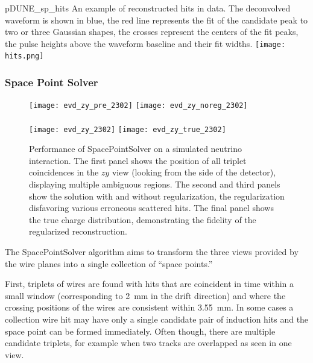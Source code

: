 \begin{dunefigure}
{pDUNE_sp_hits}
{An example of reconstructed hits in  data. The deconvolved waveform is shown in blue, the red line represents the fit of the candidate peak to two or three Gaussian shapes, the crosses represent the centers of the fit peaks, the pulse heights above the waveform baseline and their fit widths.}
\texttt{[image: hits.png]}
\end{dunefigure}


\subsubsection{Space Point Solver}

\begin{figure}
\texttt{[image: evd\_zy\_pre\_2302]}
\texttt{[image: evd\_zy\_noreg\_2302]}\\
\\
\texttt{[image: evd\_zy\_2302]}
\texttt{[image: evd\_zy\_true\_2302]}
\\

\caption[Event displays of SpacePointSolver performance]{Performance of SpacePointSolver on a simulated  neutrino interaction. The first panel shows the position of all triplet coincidences in the $zy$ view (looking from the side of the detector), displaying multiple ambiguous regions. The second and third panels show the solution with and without regularization, the regularization disfavoring various erroneous scattered hits. The final panel shows the true charge distribution, demonstrating %
the fidelity of the regularized reconstruction.}

\label{fig:spacepoint}
\end{figure} %

The SpacePointSolver algorithm aims to transform the three \twod views provided by the wire planes into a single collection of \threed ``space points.''

First, triplets of wires are found with hits that are coincident in time within a small window (corresponding to \SI{2}{mm} in the drift direction) and where the crossing positions of the wires are consistent within \SI{3.55}{mm}. In some cases a collection wire hit may have only a single candidate pair of induction hits and the space point can be formed immediately. Often though, there are multiple candidate triplets, for example when two tracks are overlapped as seen in one view.

